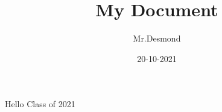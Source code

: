 \documentclass{article}
\title{My Document}
\date{20-10-2021}
\author{Mr.Desmond}
\begin{document}
    \maketitle
    \newpage
    Hello Class of 2021
\end{document}
